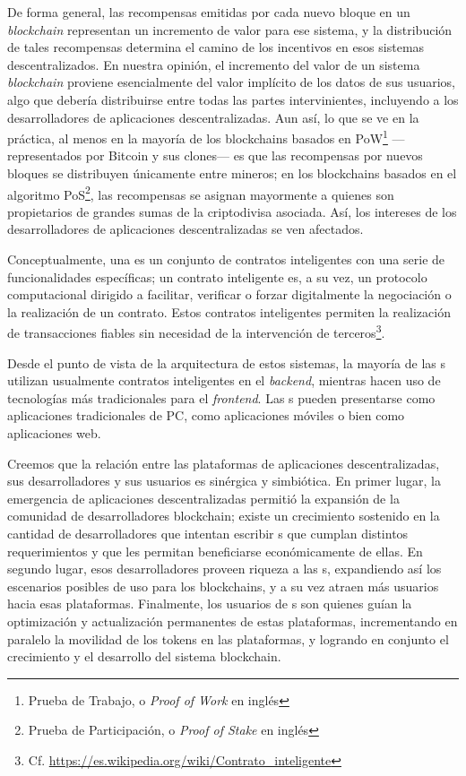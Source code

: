 De forma general, las recompensas emitidas por cada nuevo bloque en un \textit{blockchain} representan un incremento de valor para ese sistema, y la distribución de tales recompensas determina el camino de los incentivos en esos sistemas descentralizados. En nuestra opinión, el incremento del valor de un sistema \textit{blockchain} proviene esencialmente del valor implícito de los datos de sus usuarios, algo que debería distribuirse entre todas las partes intervinientes, incluyendo a los desarrolladores de aplicaciones descentralizadas. Aun así, lo que se ve en la práctica, al menos en la mayoría de los blockchains basados en PoW\footnote{Prueba de Trabajo, o \textit{Proof of Work} en inglés} —representados por Bitcoin y sus clones— es que las recompensas por nuevos bloques se distribuyen únicamente entre mineros; en los blockchains basados en el algoritmo PoS\footnote{Prueba de Participación, o \textit{Proof of Stake} en inglés}, las recompensas se asignan mayormente a quienes son propietarios de grandes sumas de la criptodivisa asociada. Así, los intereses de los desarrolladores de aplicaciones descentralizadas se ven afectados.

Conceptualmente, una \dapp es un conjunto de contratos inteligentes con una serie de funcionalidades específicas; un contrato inteligente es, a su vez, un protocolo computacional dirigido a facilitar, verificar o forzar digitalmente la negociación o la realización de un contrato. Estos contratos inteligentes permiten la realización de transacciones fiables sin necesidad de la intervención de terceros\footnote{Cf. \url{https://es.wikipedia.org/wiki/Contrato\_inteligente}}.

Desde el punto de vista de la arquitectura de estos sistemas, la mayoría de las {\dapp}s utilizan usualmente contratos inteligentes en el \textit{backend}, mientras hacen uso de tecnologías más tradicionales para el \textit{frontend}. Las {\dapp}s pueden presentarse como aplicaciones tradicionales de PC, como aplicaciones móviles o bien como aplicaciones web.

Creemos que la relación entre las plataformas de aplicaciones descentralizadas, sus desarrolladores y sus usuarios es sinérgica y simbiótica. En primer lugar, la emergencia de aplicaciones descentralizadas permitió la expansión de la comunidad de desarrolladores blockchain; existe un crecimiento sostenido en la cantidad de desarrolladores que intentan escribir {\dapp}s que cumplan distintos requerimientos y que les permitan beneficiarse económicamente de ellas. En segundo lugar, esos desarrolladores proveen riqueza a las {\dapp}s, expandiendo así los escenarios posibles de uso para los blockchains, y a su vez atraen más usuarios hacia esas plataformas. Finalmente, los usuarios de {\dapp}s son quienes guían la optimización y actualización permanentes de estas plataformas, incrementando en paralelo la movilidad de los tokens en las plataformas, y logrando en conjunto el crecimiento y el desarrollo del sistema blockchain.

